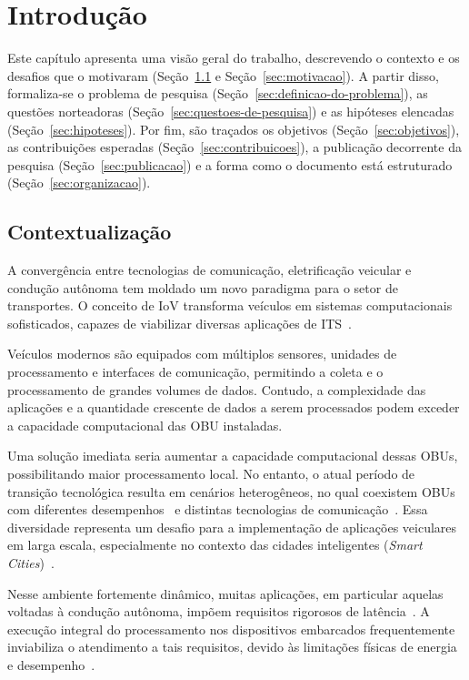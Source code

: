 \chapter{Introdução}
\label{cap:introducao}

Este capítulo apresenta uma visão geral do trabalho, descrevendo o contexto e os desafios que o motivaram (Seção~\ref{sec:contextualizacao} e Seção~\ref{sec:motivacao}). A partir disso, formaliza-se o problema de pesquisa (Seção~\ref{sec:definicao-do-problema}), as questões norteadoras (Seção~\ref{sec:questoes-de-pesquisa}) e as hipóteses elencadas (Seção~\ref{sec:hipoteses}). Por fim, são traçados os objetivos (Seção~\ref{sec:objetivos}), as contribuições esperadas (Seção~\ref{sec:contribuicoes}), a publicação decorrente da pesquisa (Seção~\ref{sec:publicacao}) e a forma como o documento está estruturado (Seção~\ref{sec:organizacao}).

\section{Contextualização}
\label{sec:contextualizacao}

A convergência entre tecnologias de comunicação, eletrificação veicular e condução autônoma tem moldado um novo paradigma para o setor de transportes. O conceito de \gls{IoV} transforma veículos em sistemas computacionais sofisticados, capazes de viabilizar diversas aplicações de \gls{ITS}~\cite{RANI2023108543}. 

Veículos modernos são equipados com múltiplos sensores, unidades de processamento e interfaces de comunicação, permitindo a coleta e o processamento de grandes volumes de dados. Contudo, a complexidade das aplicações e a quantidade crescente de dados a serem processados podem exceder a capacidade computacional das \gls{OBU} instaladas.

Uma solução imediata seria aumentar a capacidade computacional dessas \glspl{OBU}, possibilitando maior processamento local. No entanto, o atual período de transição tecnológica resulta em cenários heterogêneos, no qual coexistem \glspl{OBU} com diferentes desempenhos~\cite{luo2024} e distintas tecnologias de comunicação~\cite{zheng2015}. Essa diversidade representa um desafio para a implementação de aplicações veiculares em larga escala, especialmente no contexto das cidades inteligentes (\textit{Smart Cities})~\cite{luo2024}.

Nesse ambiente fortemente dinâmico, muitas aplicações, em particular aquelas voltadas à condução autônoma, impõem requisitos rigorosos de latência~\cite{chao2025}. A execução integral do processamento nos dispositivos embarcados frequentemente inviabiliza o atendimento a tais requisitos, devido às limitações físicas de energia e desempenho~\cite{luo2024}.

